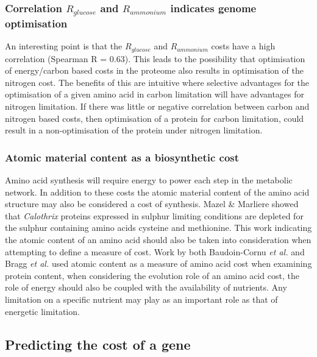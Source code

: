 \subsubsection{Correlation $R_{glucose}$ and $R_{ammonium}$ indicates genome optimisation}

An interesting point is that the $R_{glucose}$ and $R_{ammonium}$ costs have a high correlation (Spearman R = 0.63). This leads to the possibility that optimisation of energy/carbon based costs in the proteome also results in optimisation of the nitrogen cost. The benefits of this are intuitive where selective advantages for the optimisation of a given amino acid in carbon limitation will have advantages for nitrogen limitation. If there was little or negative correlation between carbon and nitrogen based costs, then optimisation of a protein for carbon limitation, could result in a non-optimisation of the protein under nitrogen limitation.

\subsubsection{Atomic material content as a biosynthetic cost}

Amino acid synthesis will require energy to power each step in the metabolic network. In addition to these costs the atomic material content of the amino acid structure may also be considered a cost of synthesis. Mazel \& Marliere \cite{mazel1989} showed that \emph{Calothrix} proteins expressed in sulphur limiting conditions are depleted for the sulphur containing amino acids cysteine and methionine. This work indicating the atomic content of an amino acid should also be taken into consideration when attempting to define a measure of cost. Work by both Baudoin-Cornu \emph{et al.} \cite{baudoin2001} and Bragg \emph{et al.} \cite{bragg2006} used atomic content as a measure of amino acid cost when examining protein content, when considering the evolution role of an amino acid cost, the role of energy should also be coupled with the availability of nutrients. Any limitation on a specific nutrient may play as an important role as that of energetic limitation.

\subsection{Predicting the cost of a gene}

